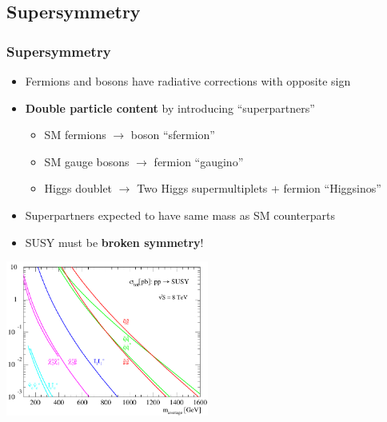\documentclass[10pt, svgnames]{beamer}
\begin{document}
\subsection{Supersymmetry}

\begin{frame}
  \frametitle{Supersymmetry}
  \begin{itemize}
    \item Fermions and bosons have radiative corrections with opposite sign
    \item \textbf{\color{nice_blue} Double particle content} by introducing
      ``superpartners''
      \begin{itemize}
        \item SM fermions $\rightarrow$ boson ``sfermion''
        \item SM gauge bosons $\rightarrow$ fermion ``gaugino''
        \item Higgs doublet $\rightarrow$ Two Higgs supermultiplets +
          fermion ``Higgsinos''
      \end{itemize}
    \item Superpartners expected to have same mass as SM counterparts
    \item SUSY must be \textbf{\color{nice_blue} broken symmetry}!
  \end{itemize}
  \begin{center}
    \includegraphics[width=0.5\textwidth]{figures/theory/prospino_lhc8.pdf}
  \end{center}
\end{frame}
\end{document}
